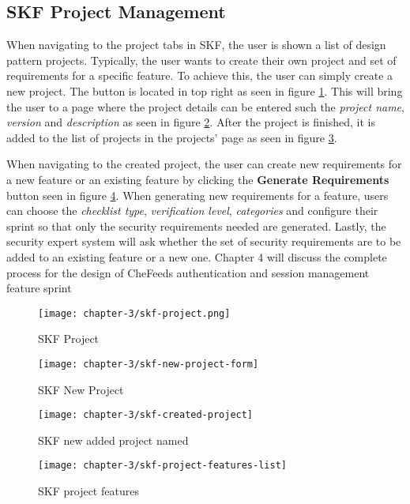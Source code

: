 \subsection{SKF Project Management}
When navigating to the project tabs in SKF, the user is shown a list of design pattern projects. Typically, the user wants to create their own project and set of requirements for a specific feature. To achieve this, the user can simply create a new project. The button is located in top right as seen in figure \ref{fig:skf-project}. This will bring the user to a page where the project details can be entered such the \emph{project name}, \emph{version} and \emph{description} as seen in figure \ref{fig:skf-new-project}. After the project is finished, it is added to the list of projects in the projects' page as seen in figure \ref{fig:skf-test-project}. 

When navigating to the created project, the user can create new requirements for a new feature or an existing feature by clicking the \textbf{Generate Requirements} button seen in figure \ref{fig:skf-project-features}. When generating new requirements for a feature, users can choose the \emph{checklist type}, \emph{verification level}, \emph{categories} and configure their sprint so that only the security requirements needed are generated. Lastly, the security expert system will ask whether the set of security requirements are to be added to an existing feature or a new one. Chapter 4 will discuss the complete process for the design of CheFeeds authentication and session management feature sprint

\begin{figure}
    \centering
    \texttt{[image: chapter-3/skf-project.png]}
    \caption{SKF Project}
    \label{fig:skf-project}
\end{figure}

\begin{figure}
    \centering
    \texttt{[image: chapter-3/skf-new-project-form]}
    \caption{SKF New Project}
    \label{fig:skf-new-project}
\end{figure}

\begin{figure}
    \centering
    \texttt{[image: chapter-3/skf-created-project]}
    \caption{SKF new added project named }
    \label{fig:skf-test-project}
\end{figure}

\begin{figure}
    \centering
    \texttt{[image: chapter-3/skf-project-features-list]}
    \caption{SKF project features}
    \label{fig:skf-project-features}
\end{figure}

